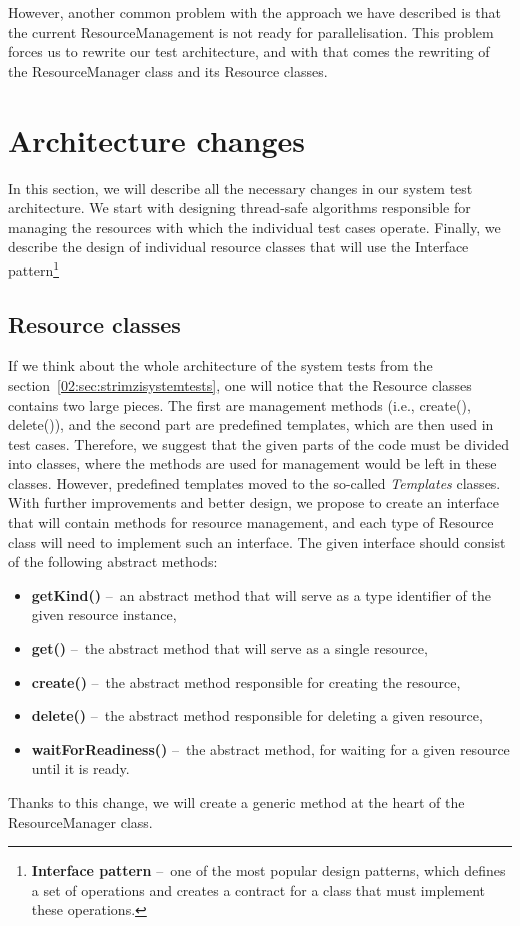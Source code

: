 However, another common problem with the approach we have described is that the current ResourceManagement is not ready for parallelisation.
This problem forces us to rewrite our test architecture, and with that comes the rewriting of the ResourceManager class and its Resource classes.

\section{Architecture changes}
\label{04:architecturechanges}

In this section, we will describe all the necessary changes in our system test architecture.
We start with designing thread-safe algorithms responsible for managing the resources with which the individual test cases operate.
Finally, we describe the design of individual resource classes that will use the Interface pattern\footnote{\textbf{Interface pattern} \---\ one of the most popular design patterns, which defines a set of operations and creates a contract for a class that must implement these operations.}

\subsection{Resource classes}

If we think about the whole architecture of the system tests from the section~\ref{02:sec:strimzisystemtests}, one will notice that the Resource classes contains two large pieces.
The first are management methods (i.e., create(), delete()), and the second part are predefined templates, which are then used in test cases.
Therefore, we suggest that the given parts of the code must be divided into classes, where the methods are used for management would be left in these classes.
However, predefined templates moved to the so-called \emph{Templates} classes.
With further improvements and better design, we propose to create an interface that will contain methods for resource management, and each type of Resource class will need to implement such an interface.
The given interface should consist of the following abstract methods:
\begin{itemize}[itemsep = 1mm, parsep = 0pt]
    \item \textbf {getKind()} \---\ an abstract method that will serve as a type identifier of the given resource instance,
    \item \textbf {get()} \---\ the abstract method that will serve as a single resource,
    \item \textbf {create()} \---\ the abstract method responsible for creating the resource,
    \item \textbf {delete()} \---\ the abstract method responsible for deleting a given resource,
    \item \textbf {waitForReadiness()} \---\ the abstract method, for waiting for a given resource until it is ready.
\end{itemize}
Thanks to this change, we will create a generic method at the heart of the ResourceManager class.

